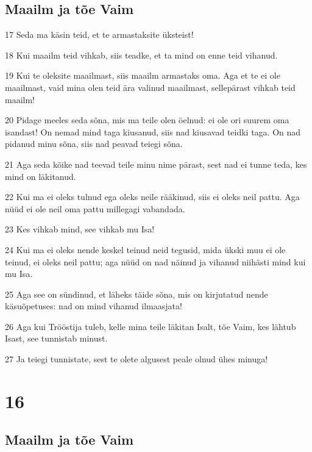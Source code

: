 \section*{Maailm ja tõe Vaim}

\par 17 Seda ma käsin teid, et te armastaksite üksteist!
\par 18 Kui maailm teid vihkab, siis teadke, et ta mind on enne teid vihanud.
\par 19 Kui te oleksite maailmast, siis maailm armastaks oma. Aga et te ei ole maailmast, vaid mina olen teid ära valinud maailmast, sellepärast vihkab teid maailm!
\par 20 Pidage meeles seda sõna, mis ma teile olen öelnud: ei ole ori suurem oma isandast! On nemad mind taga kiusanud, siis nad kiusavad teidki taga. On nad pidanud minu sõna, siis nad peavad teiegi sõna.
\par 21 Aga seda kõike nad teevad teile minu nime pärast, sest nad ei tunne teda, kes mind on läkitanud.
\par 22 Kui ma ei oleks tulnud ega oleks neile rääkinud, siis ei oleks neil pattu. Aga nüüd ei ole neil oma pattu millegagi vabandada.
\par 23 Kes vihkab mind, see vihkab mu Isa!
\par 24 Kui ma ei oleks nende keskel teinud neid tegusid, mida ükski muu ei ole teinud, ei oleks neil pattu; aga nüüd on nad näinud ja vihanud niihästi mind kui mu Isa.
\par 25 Aga see on sündinud, et läheks täide sõna, mis on kirjutatud nende käsuõpetuses: nad on mind vihanud ilmaasjata!
\par 26 Aga kui Trööstija tuleb, kelle mina teile läkitan Isalt, tõe Vaim, kes lähtub Isast, see tunnistab minust.
\par 27 Ja teiegi tunnistate, sest te olete algusest peale olnud ühes minuga!


\chapter{16}

\section*{Maailm ja tõe Vaim}

